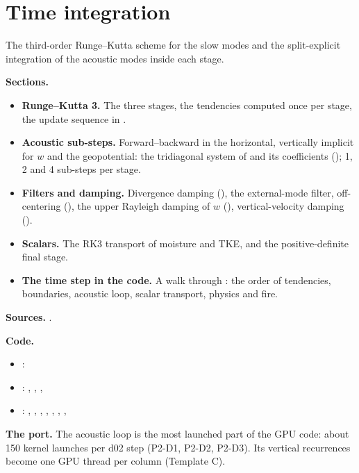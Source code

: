 \chapter{Time integration}\label{ch:time}

The third-order Runge--Kutta scheme for the slow modes and the split-explicit integration of the acoustic modes inside each stage.

\begin{outline}[(card B-04)]
\textbf{Sections.}
\begin{itemize}
    \item \textbf{Runge--Kutta 3.} The three stages, the tendencies computed once per stage, the update sequence in .
    \item \textbf{Acoustic sub-steps.} Forward--backward in the horizontal, vertically implicit for $w$ and the geopotential: the tridiagonal system of  and its coefficients (); 1, 2 and 4 sub-steps per stage.
    \item \textbf{Filters and damping.} Divergence damping (), the external-mode filter, off-centering (), the upper Rayleigh damping of $w$ (), vertical-velocity damping ().
    \item \textbf{Scalars.} The RK3 transport of moisture and TKE, and the positive-definite final stage.
    \item \textbf{The time step in the code.} A walk through : the order of tendencies, boundaries, acoustic loop, scalar transport, physics and fire.
\end{itemize}
\textbf{Sources.} \citet{wicker2002,klemp2007,skamarock2019}.

\textbf{Code.}
\begin{itemize}
    \item {}: 
    \item {}: , , , 
    \item {}: , , , , , , , 
\end{itemize}
\textbf{The port.} The acoustic loop is the most launched part of the GPU code: about 150 kernel launches per d02 step (P2-D1, P2-D2, P2-D3). Its vertical recurrences become one GPU thread per column (Template C).
\end{outline}
